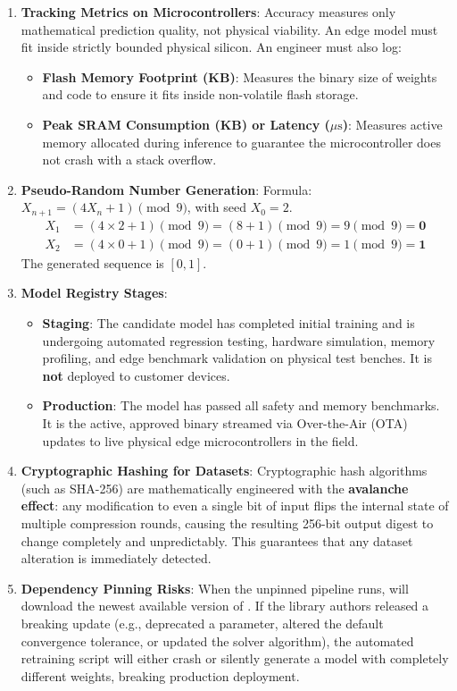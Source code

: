 \begin{enumerate}
    \item \textbf{Tracking Metrics on Microcontrollers}:
    Accuracy measures only mathematical prediction quality, not physical viability. An edge model must fit inside strictly bounded physical silicon. An engineer must also log:
    \begin{itemize}
        \item \textbf{Flash Memory Footprint (KB)}: Measures the binary size of weights and code to ensure it fits inside non-volatile flash storage.
        \item \textbf{Peak SRAM Consumption (KB) or Latency ($\mu\text{s}$)}: Measures active memory allocated during inference to guarantee the microcontroller does not crash with a stack overflow.
    \end{itemize}

    \item \textbf{Pseudo-Random Number Generation}:
    Formula: $X_{n+1} = (4 X_n + 1) \pmod 9$, with seed $X_0 = 2$.
    \begin{align*}
    X_1 &= (4 \times 2 + 1) \pmod 9 = (8 + 1) \pmod 9 = 9 \pmod 9 = \mathbf{0} \\
    X_2 &= (4 \times 0 + 1) \pmod 9 = (0 + 1) \pmod 9 = 1 \pmod 9 = \mathbf{1}
    \end{align*}
    The generated sequence is $[0, 1]$.

    \item \textbf{Model Registry Stages}:
    \begin{itemize}
        \item \textbf{Staging}: The candidate model has completed initial training and is undergoing automated regression testing, hardware simulation, memory profiling, and edge benchmark validation on physical test benches. It is \textbf{not} deployed to customer devices.
        \item \textbf{Production}: The model has passed all safety and memory benchmarks. It is the active, approved binary streamed via Over-the-Air (OTA) updates to live physical edge microcontrollers in the field.
    \end{itemize}

    \item \textbf{Cryptographic Hashing for Datasets}:
    Cryptographic hash algorithms (such as SHA-256) are mathematically engineered with the \textbf{avalanche effect}: any modification to even a single bit of input flips the internal state of multiple compression rounds, causing the resulting 256-bit output digest to change completely and unpredictably. This guarantees that any dataset alteration is immediately detected.

    \item \textbf{Dependency Pinning Risks}:
    When the unpinned pipeline runs,  will download the newest available version of . If the library authors released a breaking update (e.g., deprecated a parameter, altered the default convergence tolerance, or updated the solver algorithm), the automated retraining script will either crash or silently generate a model with completely different weights, breaking production deployment.
\end{enumerate}
